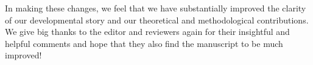 \documentclass[11pt,a4paper]{letter} %
\begin{document}
\begin{letter}{}
\medskip

\noindent In making these changes, we feel that we have substantially improved the clarity of our developmental story and our theoretical and methodological contributions. We give big thanks to the editor and reviewers again for their insightful and helpful comments and hope that they also find the manuscript to be much improved!


\end{letter}
\end{document}
